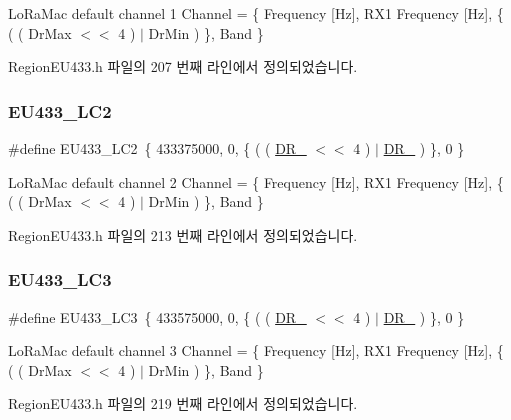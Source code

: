 Lo\+Ra\+Mac default channel 1 Channel = \{ Frequency \mbox{[}Hz\mbox{]}, R\+X1 Frequency \mbox{[}Hz\mbox{]}, \{ ( ( Dr\+Max $<$$<$ 4 ) $\vert$ Dr\+Min ) \}, Band \} 

Region\+E\+U433.\+h 파일의 207 번째 라인에서 정의되었습니다.

\mbox{\label{group___r_e_g_i_o_n_e_u433_gae1c54a191172715ddc7c0c7f900009b7}} 
\subsubsection{\texorpdfstring{E\+U433\+\_\+\+L\+C2}{EU433\_LC2}}
{\footnotesize\ttfamily \#define E\+U433\+\_\+\+L\+C2~\{ 433375000, 0, \{ ( ( \mbox{\hyperlink{group___r_e_g_i_o_n_ga872e12c82020c02a7f70a1c6ed1375df}{D\+R\+\_}} $<$$<$ 4 ) $\vert$ \mbox{\hyperlink{group___r_e_g_i_o_n_ga6c4ef966b4f3d5eb7597b087f2b97095}{D\+R\+\_}} ) \}, 0 \}}

Lo\+Ra\+Mac default channel 2 Channel = \{ Frequency \mbox{[}Hz\mbox{]}, R\+X1 Frequency \mbox{[}Hz\mbox{]}, \{ ( ( Dr\+Max $<$$<$ 4 ) $\vert$ Dr\+Min ) \}, Band \} 

Region\+E\+U433.\+h 파일의 213 번째 라인에서 정의되었습니다.

\mbox{\label{group___r_e_g_i_o_n_e_u433_ga4e6b881bf178cbd3cc8ab2716a24a231}} 
\subsubsection{\texorpdfstring{E\+U433\+\_\+\+L\+C3}{EU433\_LC3}}
{\footnotesize\ttfamily \#define E\+U433\+\_\+\+L\+C3~\{ 433575000, 0, \{ ( ( \mbox{\hyperlink{group___r_e_g_i_o_n_ga872e12c82020c02a7f70a1c6ed1375df}{D\+R\+\_}} $<$$<$ 4 ) $\vert$ \mbox{\hyperlink{group___r_e_g_i_o_n_ga6c4ef966b4f3d5eb7597b087f2b97095}{D\+R\+\_}} ) \}, 0 \}}

Lo\+Ra\+Mac default channel 3 Channel = \{ Frequency \mbox{[}Hz\mbox{]}, R\+X1 Frequency \mbox{[}Hz\mbox{]}, \{ ( ( Dr\+Max $<$$<$ 4 ) $\vert$ Dr\+Min ) \}, Band \} 

Region\+E\+U433.\+h 파일의 219 번째 라인에서 정의되었습니다.


